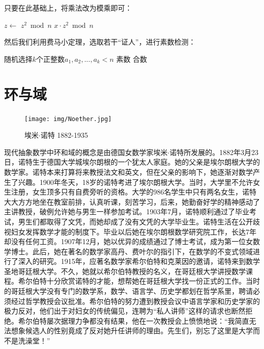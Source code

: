 \documentclass[b5paper]{ctexart}
\begin{document}
\begin{Answer}[ref={ex:Lagrange-theorem}]
{只要在此基础上，将乘法改为模乘即可：

\begin{algorithmic}[1]
    \State {}
  \EndIf
  \State $z \gets$ 
    \State \Return $z^2 \bmod n$
  \Else
    \State \Return $x \cdot z^2 \bmod n$
  \EndIf
\EndFunction
\end{algorithmic}

然后我们利用费马小定理，选取若干“证人”，进行素数检测：

\begin{algorithmic}[1]
  \State 随机选择$k$个正整数$a_1, a_2, ..., a_k < n$
    \State \Return 素数
  \Else
    \State \Return 合数
  \EndIf
\EndFunction
\end{algorithmic}
}
\end{Answer}

\section{环与域}

\begin{figure}
 \centering
 \texttt{[image: img/Noether.jpg]}
 \captionsetup{labelformat=empty}
 \caption{埃米$\cdot$诺特 1882-1935}
 \label{fig:Noether}
\end{figure}

现代抽象数学中环和域的概念是由德国女数学家埃米$\cdot$诺特所发展的。1882年3月23日，诺特生于德国大学城埃尔朗根的一个犹太人家庭。她的父亲是埃尔朗根大学的数学家。诺特本来打算将来教授法文和英文，但在父亲的影响下，她逐渐对数学产生了兴趣。1900年冬天，18岁的诺特考进了埃尔朗根大学。当时，大学里不允许女生注册，女生顶多只有自费旁听的资格。大学的986名学生中只有两名女生，诺特大大方方地坐在教室前排，认真听课，刻苦学习，后来，她勤奋好学的精神感动了主讲教授，破例允许她与男生一样参加考试。1903年7月，诺特顺利通过了毕业考试，男生们都取得了文凭，而她却成了没有文凭的大学毕业生。诺特生活在公开歧视妇女发挥数学才能的制度下。毕业以后她在埃尔朗根数学研究院工作，长达7年却没有任何工资。1907年12月，她以优异的成绩通过了博士考试，成为第一位女数学博士。此后，她在著名的数学家高丹、费叶尔的指引下，在数学的不变式领域进行了深入的研究。1915年，应著名数学家希尔伯特和克莱因的邀请，诺特来到数学圣地哥廷根大学。不久，她就以希尔伯特教授的名义，在哥廷根大学讲授数学课程。希尔伯特十分欣赏诺特的才能，想帮她在哥廷根大学找一份正式的工作。当时的哥廷根大学没有专门的数学系，数学、语言学、历史学都划在哲学系里，聘请必须经过哲学教授会议批准。希尔伯特的努力遭到教授会议中语言学家和历史学家的极力反对，他们出于对妇女的传统偏见，连聘为“私人讲师”这样的请求也断然拒绝。希尔伯特屡次据理力争都没有结果，他在一次教授会上愤愤地说：“我简直无法想象候选人的性别竟成了反对她升任讲师的理由。先生们，别忘了这里是大学而不是洗澡堂！”
\end{document}
